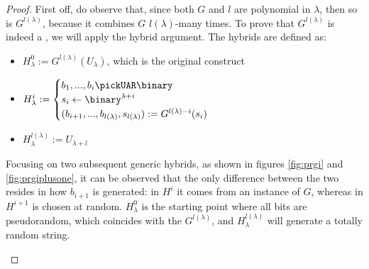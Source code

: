 \begin{proof}

    First off, do observe that, since both $G$ and $l$ are polynomial in $\lambda$, then so is $G^{l(\lambda)}$, because it combines $G$ $l(\lambda)$-many times. To prove that $G^{l(\lambda)}$ is indeed a \prg, we will apply the hybrid argument. The hybrids are defined as:
    \begin{itemize}
        \item $H_{\lambda}^{0} := G^{l(\lambda)}(U_{\lambda})$, which is the original construct
        \item $H_{\lambda}^{i} :=
            \begin{cases}
                b_1 , ..., b_{i} \pickUAR \binary \\
                s_{i} \leftarrow \binary^{\lambda+i} \\
                (b_{i+1}, ..., b_{l(\lambda)}, s_{l(\lambda)}) := G^{l(\lambda)-i}(s_{i})
            \end{cases}$
        \item $H_{\lambda}^{l(\lambda)} := U_{\lambda + l}$
    \end{itemize}

    Focusing on two subsequent generic hybrids, as shown in figures \ref{fig:prgi} and \ref{fig:prgiplusone}, it can be observed that the only difference between the two resides in how $b_{i + 1}$ is generated: in $H^i$ it comes from an instance of $G$, whereas in $H^{i + 1}$ is chosen at random. $H_\lambda^0$ is the starting point where all bits are pseudorandom, which coincides with the $G^{l(\lambda)}$, and $H_\lambda^{l(\lambda)}$ will generate a totally random string.

    \begin{figure}[ht]

\end{figure}
\end{proof}
